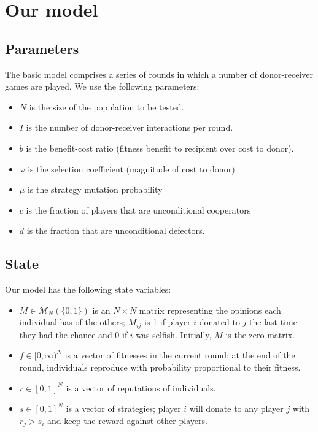 \documentclass{amsart}
\begin{document}
\section{Our model}
\label{sec:model}

\subsection{Parameters}

The basic model comprises a series of rounds in which a number of
donor-receiver games are played. We use the following parameters:

\begin{itemize}
\item $N$ is the size of the population to be tested.
\item $I$ is the number of donor-receiver interactions per round.
\item $b$ is the benefit-cost ratio (fitness benefit to recipient over
  cost to donor).
\item $\omega$ is the selection coefficient (magnitude of cost to
  donor).
\item $\mu$ is the strategy mutation probability
\item $c$ is the fraction of players that are unconditional
  cooperators
\item $d$ is the fraction that are unconditional defectors.
\end{itemize}

\subsection{State}

Our model has the following state variables:

\begin{itemize}
\item $M \in \mathcal{M}_N(\{0,1\})$ is an $N \times N$ matrix
  representing the opinions each individual has of the others;
  $M_{ij}$ is 1 if player $i$ donated to $j$ the last time they had
  the chance and 0 if $i$ was selfish. Initially, $M$ is the zero
  matrix.
\item $f \in [0, \infty)^N$ is a vector of fitnesses in the current
  round; at the end of the round, individuals reproduce with
  probability proportional to their fitness.
\item $r \in [0,1]^N$ is a vector of reputations of individuals.
\item $s \in [0,1]^N$ is a vector of strategies; player $i$ will
  donate to any player $j$ with $r_j > s_i$ and keep the reward
  against other players.
\end{itemize}
\end{document}
